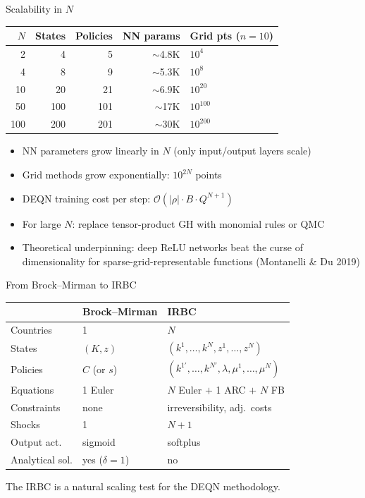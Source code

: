 \documentclass[aspectratio=169,11pt]{beamer}
\newcommand{\emphc}[1]{\textcolor{harvardcrimson}{#1}}
\begin{document}
\begin{frame}{Scalability in $N$}
\begin{center}
\begin{tabular}{rrrrl}
\toprule
$N$ & \textbf{States} & \textbf{Policies} & \textbf{NN params} & \textbf{Grid pts ($n\!=\!10$)} \\
\midrule
2 & 4 & 5 & $\sim$4.8K & $10^4$ \\
4 & 8 & 9 & $\sim$5.3K & $10^8$ \\
10 & 20 & 21 & $\sim$6.9K & $10^{20}$ \\
50 & 100 & 101 & $\sim$17K & $10^{100}$ \\
100 & 200 & 201 & $\sim$30K & $10^{200}$ \\
\bottomrule
\end{tabular}
\end{center}

\vspace{0.5em}
\begin{itemize}
    \item NN parameters grow \emphc{linearly} in $N$ (only input/output layers scale)
    \item Grid methods grow \emphc{exponentially}: $10^{2N}$ points
    \item DEQN training cost per step: $\mathcal{O}(|\rho| \cdot B \cdot Q^{N+1})$
    \item For large $N$: replace tensor-product GH with monomial rules or QMC
    \item Theoretical underpinning: \emphc{deep ReLU networks} beat the curse of dimensionality for sparse-grid-representable functions (Montanelli \& Du 2019)
\end{itemize}
\end{frame}

\begin{frame}{From Brock--Mirman to IRBC}
\begin{center}
\begin{tabular}{lll}
\toprule
& \textbf{Brock--Mirman} & \textbf{IRBC} \\
\midrule
Countries & 1 & $N$ \\
States & $(K, z)$ & $(k^1, \ldots, k^N, z^1, \ldots, z^N)$ \\
Policies & $C$ (or $s$) & $(k^{1\prime}, \ldots, k^{N\prime}, \lambda, \mu^1, \ldots, \mu^N)$ \\
Equations & 1 Euler & $N$ Euler $+$ 1 ARC $+$ $N$ FB \\
Constraints & none & irreversibility, adj.\ costs \\
Shocks & 1 & $N+1$ \\
Output act. & sigmoid & softplus \\
Analytical sol. & yes ($\delta=1$) & no \\
\bottomrule
\end{tabular}
\end{center}

\vspace{0.3em}
{\small The IRBC is a natural \emphc{scaling test} for the DEQN methodology.}
\end{frame}
\end{document}

